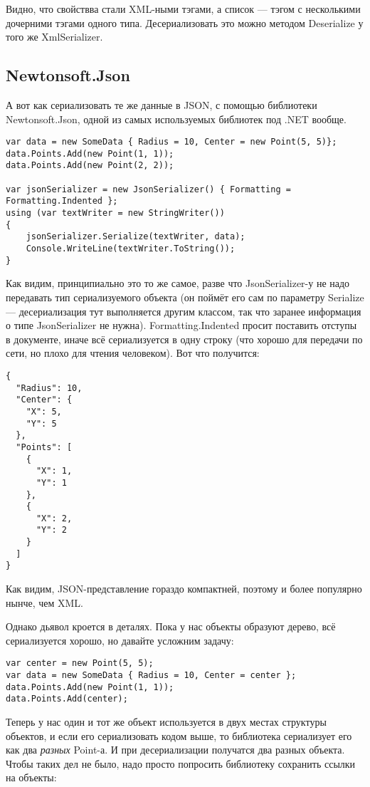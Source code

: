 \documentclass[a5paper]{article}
\begin{document}
Видно, что свойствва стали XML-ными тэгами, а список --- тэгом с несколькими дочерними тэгами одного типа. Десериализовать это можно методом Deserialize у того же XmlSerializer.

\subsection{Newtonsoft.Json}

А вот как сериализовать те же данные в JSON, с помощью библиотеки Newtonsoft.Json, одной из самых используемых библиотек под .NET вообще.

\begin{verbatim}
var data = new SomeData { Radius = 10, Center = new Point(5, 5)};
data.Points.Add(new Point(1, 1));
data.Points.Add(new Point(2, 2));

var jsonSerializer = new JsonSerializer() { Formatting = Formatting.Indented };
using (var textWriter = new StringWriter())
{
    jsonSerializer.Serialize(textWriter, data);
    Console.WriteLine(textWriter.ToString());
}
\end{verbatim}

Как видим, принципиально это то же самое, разве что JsonSerializer-у не надо передавать тип сериализуемого объекта (он поймёт его сам по параметру Serialize --- десериализация тут выполняется другим классом, так что заранее информация о типе JsonSerializer не нужна). Formatting.Indented просит поставить отступы в документе, иначе всё сериализуется в одну строку (что хорошо для передачи по сети, но плохо для чтения человеком). Вот что получится:

\begin{verbatim}
{
  "Radius": 10,
  "Center": {
    "X": 5,
    "Y": 5
  },
  "Points": [
    {
      "X": 1,
      "Y": 1
    },
    {
      "X": 2,
      "Y": 2
    }
  ]
}
\end{verbatim}

Как видим, JSON-представление гораздо компактней, поэтому и более популярно нынче, чем XML.

Однако дьявол кроется в деталях. Пока у нас объекты образуют дерево, всё сериализуется хорошо, но давайте усложним задачу:

\begin{verbatim}
var center = new Point(5, 5);
var data = new SomeData { Radius = 10, Center = center };
data.Points.Add(new Point(1, 1));
data.Points.Add(center);
\end{verbatim}

Теперь у нас один и тот же объект используется в двух местах структуры объектов, и если его сериализовать кодом выше, то библиотека сериализует его как два \textit{разных} Point-а. И при десериализации получатся два разных объекта. Чтобы таких дел не было, надо просто попросить библиотеку сохранить ссылки на объекты:
\end{document}
